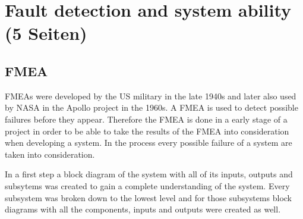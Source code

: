 \documentclass[ExampleMasters.tex]{subfiles}
\begin{document}
\clearpage


\chapter{Fault detection and system ability (5 Seiten)}
\label{chap:fault_detection}
\section{\gls{FMEA}}
\label{sec:FMEA}
\gls{FMEA}s were developed by the US military in the late 1940s and later also used by NASA in the Apollo project in the 1960s.
A \gls{FMEA} is used to detect possible failures before they appear. Therefore the \gls{FMEA} is done in a early stage of a project in order to be able to take the results of the \gls{FMEA} into consideration when developing a system. In the process every possible failure of a system are taken into consideration. 

In a first step a block diagram of the system with all of its inputs, outputs and subsytems was created to gain a complete understanding of the system. Every subsystem was broken down to the lowest level and for those subsystems block diagrams with all the components, inputs and outputs were created as well.
\end{document}
